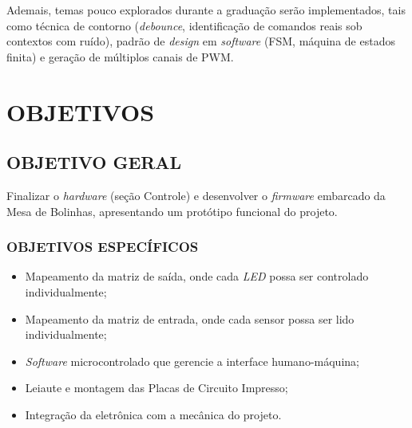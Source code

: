  Ademais, temas pouco explorados durante a graduação serão implementados, tais como técnica de contorno (\emph{debounce}, identificação de comandos reais sob contextos com ruído), padrão de \emph{design} em \emph{software} (FSM, máquina de estados finita) e geração de múltiplos canais de PWM.

\section{OBJETIVOS}
\label{sec:objetivos}

\subsection{OBJETIVO GERAL}
Finalizar o \emph{hardware} (seção Controle) e desenvolver o \emph{firmware} embarcado da Mesa de Bolinhas, apresentando um protótipo funcional do projeto.

\subsubsection{OBJETIVOS ESPECÍFICOS}
  \begin{itemize}
      \item Mapeamento da matriz de saída, onde cada \emph{LED} possa ser controlado individualmente;
      \item Mapeamento da matriz de entrada, onde cada sensor possa ser lido individualmente;
      \item \emph{Software} microcontrolado que gerencie a interface humano-máquina;
      \item Leiaute e montagem das Placas de Circuito Impresso;
      \item Integração da eletrônica com a mecânica do projeto.
  \end{itemize}
